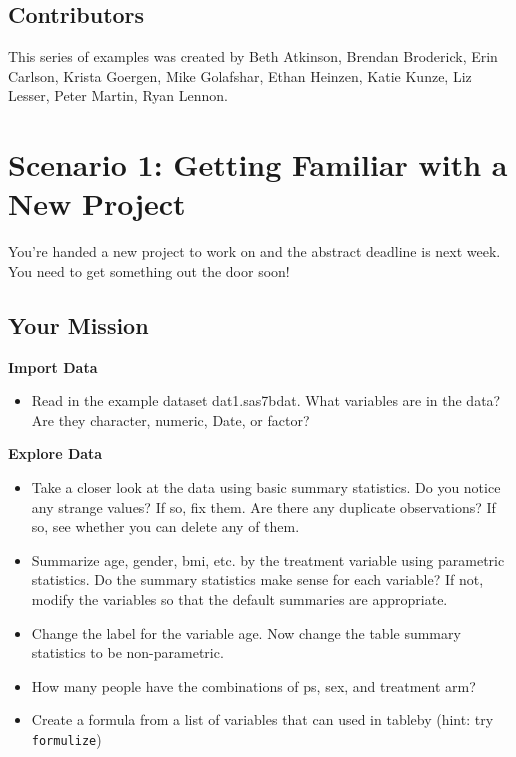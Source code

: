 \documentclass[
]{book}
\providecommand{\tightlist}{%
  \setlength{\itemsep}{0pt}\setlength{\parskip}{0pt}}
\begin{document}
\hypertarget{contributors}{%
\section{Contributors}\label{contributors}}

This series of examples was created by Beth Atkinson, Brendan Broderick, Erin Carlson, Krista Goergen, Mike Golafshar, Ethan Heinzen, Katie Kunze, Liz Lesser, Peter Martin, Ryan Lennon.

\hypertarget{scenario-1-getting-familiar-with-a-new-project}{%
\chapter{Scenario 1: Getting Familiar with a New Project}\label{scenario-1-getting-familiar-with-a-new-project}}

You're handed a new project to work on and the abstract deadline is next week. You need to get something out the door soon!

\hypertarget{your-mission}{%
\section{Your Mission}\label{your-mission}}

\textbf{Import Data}

\begin{itemize}
\tightlist
\item
  Read in the example dataset dat1.sas7bdat. What variables are in the data? Are they character, numeric, Date, or factor?
\end{itemize}

\textbf{Explore Data}

\begin{itemize}
\tightlist
\item
  Take a closer look at the data using basic summary statistics. Do you notice any strange values? If so, fix them. Are there any duplicate observations? If so, see whether you can delete any of them.
\item
  Summarize age, gender, bmi, etc. by the treatment variable using parametric statistics. Do the summary statistics make sense for each variable? If not, modify the variables so that the default summaries are appropriate.
\item
  Change the label for the variable age. Now change the table summary statistics to be non-parametric.
\item
  How many people have the combinations of ps, sex, and treatment arm?
\item
  Create a formula from a list of variables that can used in tableby (hint: try \texttt{formulize})
\end{itemize}
\end{document}
